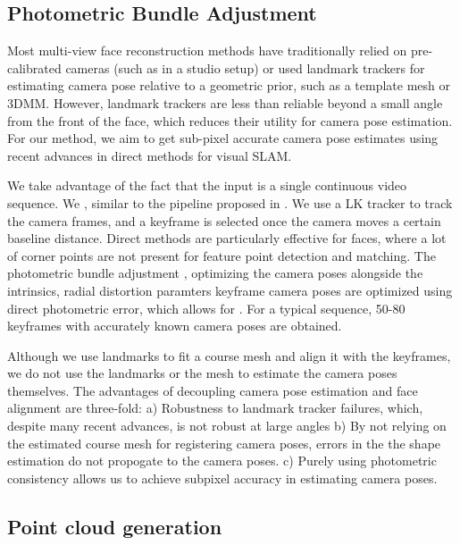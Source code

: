 \documentclass[10pt,twocolumn,letterpaper]{article}
\begin{document}
\subsection{Photometric Bundle Adjustment} \label{sec:PBA}
Most multi-view face reconstruction methods have traditionally relied on pre-calibrated cameras (such as in a studio setup) or used landmark trackers for estimating camera pose relative to a geometric prior, such as a template mesh or 3DMM. However, landmark trackers are less than reliable beyond a small angle from the front of the face, which reduces their utility for camera pose estimation.  For our method, we aim to get sub-pixel accurate camera pose estimates using recent advances in direct methods for visual SLAM.

We take advantage of the fact that the input is a single continuous video sequence. We  , similar to the pipeline proposed in \cite{ham2017monocular}. We use a LK tracker to track the camera frames, and a keyframe is selected once the camera moves a certain baseline distance. Direct methods are particularly effective for faces, where a lot of corner points are not present for feature point detection and matching.  The photometric bundle adjustment , optimizing the camera poses alongside the intrinsics, radial distortion paramters keyframe camera poses are optimized using direct photometric error, which allows for . For a typical sequence, 50-80 keyframes with accurately known camera poses are obtained.

Although we use landmarks to fit a course mesh and align it with the keyframes, we do not use the landmarks or the mesh to estimate the camera poses themselves. The advantages of decoupling camera pose estimation and face alignment are three-fold: a) Robustness to landmark tracker failures, which, despite many recent advances, is not robust at large angles  b) By not relying on the estimated course mesh for registering camera poses, errors in the the shape estimation do not propogate to the camera poses. c) Purely using photometric consistency allows us to achieve subpixel accuracy in estimating camera poses. 

\subsection{Point cloud generation} \label{sec:pcl}
\end{document}
